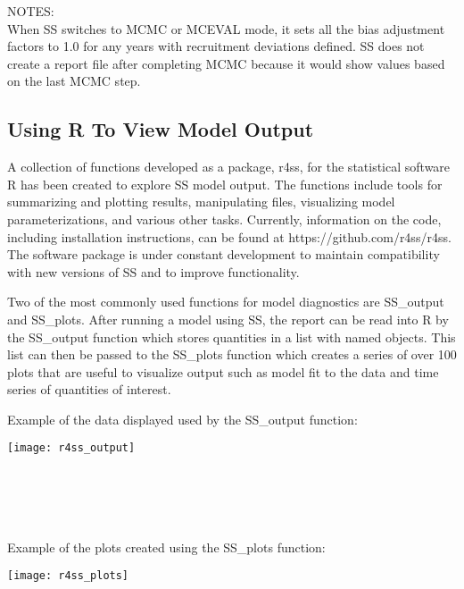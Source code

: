 \noindent NOTES:\\
When SS switches to MCMC or MCEVAL mode, it sets all the bias adjustment factors to 1.0 for any years with recruitment deviations defined.  SS does not create a report file after completing MCMC because it would show values based on the last MCMC step.

\subsection{Using R To View Model Output}
A collection of functions developed as a package, r4ss, for the statistical software R has been created to explore SS model output.  The functions include tools for summarizing and plotting results, manipulating files, visualizing model parameterizations, and various other tasks.  Currently, information on the code, including installation instructions, can be found at https://github.com/r4ss/r4ss.  The software package is under constant development to maintain compatibility with new versions of SS and to improve functionality. 

Two of the most commonly used functions for model diagnostics are SS\_output and SS\_plots.  After running a model using SS, the report can be read into R by the SS\_output function which stores quantities in a list with named objects.  This list can then be passed to the SS\_plots function which creates a series of over 100 plots that are useful to visualize output such as model fit to the data and time series of quantities of interest. 

Example of the data displayed used by the SS\_output function:
\begin{center}
	\texttt{[image: r4ss\_output]}
\end{center}
\hfil\\
\hfil\\
\hfil\\
\hfil\\
Example of the plots created using the SS\_plots function:
\begin{center}
	\texttt{[image: r4ss\_plots]}
\end{center}

